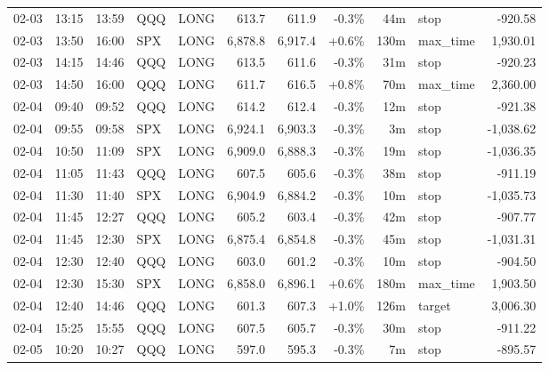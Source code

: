 \documentclass[11pt,a4paper,twoside]{article}
\begin{document}
\begin{center}
\begin{longtable}{>{\color{txtmain}}l l l l l r r r r >{\color{txtmain}}l r}
02-03 & 13:15 & 13:59 & QQQ & LONG & 613.7 & 611.9 & \textcolor{lossred}{-0.3\%} & 44m & stop & \textcolor{lossred}{-920.58} \\
02-03 & 13:50 & 16:00 & SPX & LONG & 6,878.8 & 6,917.4 & \textcolor{wingreen}{+0.6\%} & 130m & max\_time & \textcolor{wingreen}{1,930.01} \\
02-03 & 14:15 & 14:46 & QQQ & LONG & 613.5 & 611.6 & \textcolor{lossred}{-0.3\%} & 31m & stop & \textcolor{lossred}{-920.23} \\
02-03 & 14:50 & 16:00 & QQQ & LONG & 611.7 & 616.5 & \textcolor{wingreen}{+0.8\%} & 70m & max\_time & \textcolor{wingreen}{2,360.00} \\
02-04 & 09:40 & 09:52 & QQQ & LONG & 614.2 & 612.4 & \textcolor{lossred}{-0.3\%} & 12m & stop & \textcolor{lossred}{-921.38} \\
02-04 & 09:55 & 09:58 & SPX & LONG & 6,924.1 & 6,903.3 & \textcolor{lossred}{-0.3\%} & 3m & stop & \textcolor{lossred}{-1,038.62} \\
02-04 & 10:50 & 11:09 & SPX & LONG & 6,909.0 & 6,888.3 & \textcolor{lossred}{-0.3\%} & 19m & stop & \textcolor{lossred}{-1,036.35} \\
02-04 & 11:05 & 11:43 & QQQ & LONG & 607.5 & 605.6 & \textcolor{lossred}{-0.3\%} & 38m & stop & \textcolor{lossred}{-911.19} \\
02-04 & 11:30 & 11:40 & SPX & LONG & 6,904.9 & 6,884.2 & \textcolor{lossred}{-0.3\%} & 10m & stop & \textcolor{lossred}{-1,035.73} \\
02-04 & 11:45 & 12:27 & QQQ & LONG & 605.2 & 603.4 & \textcolor{lossred}{-0.3\%} & 42m & stop & \textcolor{lossred}{-907.77} \\
02-04 & 11:45 & 12:30 & SPX & LONG & 6,875.4 & 6,854.8 & \textcolor{lossred}{-0.3\%} & 45m & stop & \textcolor{lossred}{-1,031.31} \\
02-04 & 12:30 & 12:40 & QQQ & LONG & 603.0 & 601.2 & \textcolor{lossred}{-0.3\%} & 10m & stop & \textcolor{lossred}{-904.50} \\
02-04 & 12:30 & 15:30 & SPX & LONG & 6,858.0 & 6,896.1 & \textcolor{wingreen}{+0.6\%} & 180m & max\_time & \textcolor{wingreen}{1,903.50} \\
02-04 & 12:40 & 14:46 & QQQ & LONG & 601.3 & 607.3 & \textcolor{wingreen}{+1.0\%} & 126m & target & \textcolor{wingreen}{3,006.30} \\
02-04 & 15:25 & 15:55 & QQQ & LONG & 607.5 & 605.7 & \textcolor{lossred}{-0.3\%} & 30m & stop & \textcolor{lossred}{-911.22} \\
02-05 & 10:20 & 10:27 & QQQ & LONG & 597.0 & 595.3 & \textcolor{lossred}{-0.3\%} & 7m & stop & \textcolor{lossred}{-895.57} \\

\end{longtable}
\end{center}
\end{document}
